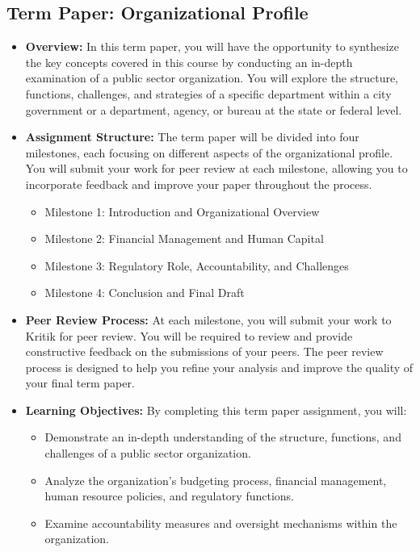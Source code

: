 \documentclass[11pt, letterpaper]{article}
\begin{document}
\subsection*{Term Paper: Organizational Profile}

\begin{itemize}
    \item \textbf{Overview:} In this term paper, you will have the opportunity to synthesize the key concepts covered in this course by conducting an in-depth examination of a public sector organization. You will explore the structure, functions, challenges, and strategies of a specific department within a city government or a department, agency, or bureau at the state or federal level.
    \item \textbf{Assignment Structure:} The term paper will be divided into four milestones, each focusing on different aspects of the organizational profile. You will submit your work for peer review at each milestone, allowing you to incorporate feedback and improve your paper throughout the process.
    \begin{itemize}
        \item Milestone 1: Introduction and Organizational Overview
        \item Milestone 2: Financial Management and Human Capital
        \item Milestone 3: Regulatory Role, Accountability, and Challenges
        \item Milestone 4: Conclusion and Final Draft
    \end{itemize}
    \item \textbf{Peer Review Process:} At each milestone, you will submit your work to Kritik for peer review. You will be required to review and provide constructive feedback on the submissions of your peers. The peer review process is designed to help you refine your analysis and improve the quality of your final term paper.
    \item \textbf{Learning Objectives:} By completing this term paper assignment, you will:
        \begin{itemize}
            \item Demonstrate an in-depth understanding of the structure, functions, and challenges of a public sector organization.
            \item Analyze the organization's budgeting process, financial management, human resource policies, and regulatory functions.
            \item Examine accountability measures and oversight mechanisms within the organization.

\end{itemize}
\end{itemize}
\end{document}
